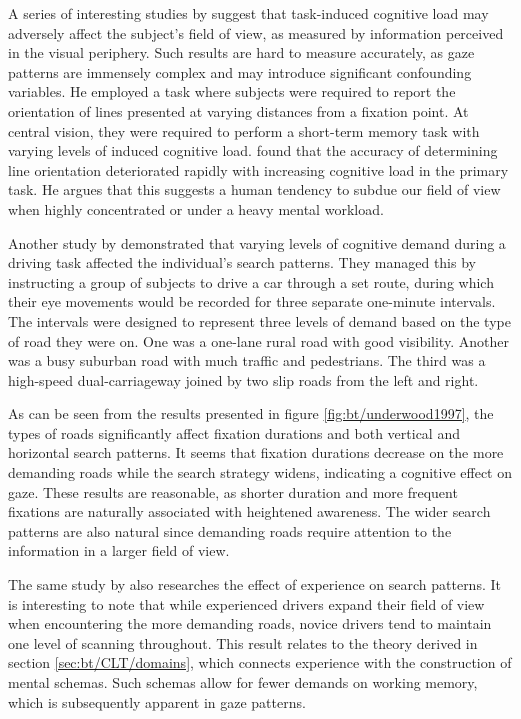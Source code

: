 A series of interesting studies by \textcite{williams1982, williams1985, williams1988} suggest that task-induced cognitive load may adversely affect the subject's field of view, as measured by information perceived in the visual periphery. Such results are hard to measure accurately, as gaze patterns are immensely complex and may introduce significant confounding variables. He employed a task where subjects were required to report the orientation of lines presented at varying distances from a fixation point. At central vision, they were required to perform a short-term memory task with varying levels of induced cognitive load. \textcite{williams1985} found that the accuracy of determining line orientation deteriorated rapidly with increasing cognitive load in the primary task. He argues that this suggests a human tendency to subdue our field of view when highly concentrated or under a heavy mental workload.

Another study by \textcite{underwood1997} demonstrated that varying levels of cognitive demand during a driving task affected the individual's search patterns. They managed this by instructing a group of subjects to drive a car through a set route, during which their eye movements would be recorded for three separate one-minute intervals. The intervals were designed to represent three levels of demand based on the type of road they were on. One was a one-lane rural road with good visibility. Another was a busy suburban road with much traffic and pedestrians. The third was a high-speed dual-carriageway joined by two slip roads from the left and right. 

As can be seen from the results presented in figure \ref{fig:bt/underwood1997}, the types of roads significantly affect fixation durations and both vertical and horizontal search patterns. It seems that fixation durations decrease on the more demanding roads while the search strategy widens, indicating a cognitive effect on gaze. These results are reasonable, as shorter duration and more frequent fixations are naturally associated with heightened awareness. The wider search patterns are also natural since demanding roads require attention to the information in a larger field of view.

The same study by \textcite{underwood1997} also researches the effect of experience on search patterns. 
It is interesting to note that while experienced drivers expand their field of view when encountering the more demanding roads, novice drivers tend to maintain one level of scanning throughout. 
This result relates to the theory derived in section \ref{sec:bt/CLT/domains}, which connects experience with the construction of mental schemas. Such schemas allow for fewer demands on working memory, which is subsequently apparent in gaze patterns.

